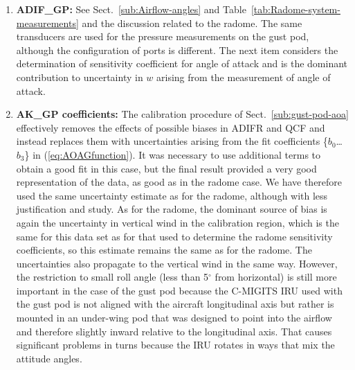 \documentclass[12pt,twoside,english]{article}\usepackage[]{graphicx}\usepackage[]{color}
\begin{document}
{{\begin{enumerate}
\item \textbf{ADIF\_GP: }See Sect.~\ref{sub:Airflow-angles} and Table~\ref{tab:Radome-system-measurements} and the discussion related to the radome. The same transducers are used for the pressure measurements on the gust pod, although the configuration of ports is different. The next item considers the determination of sensitivity coefficient for angle of attack and is the dominant contribution to uncertainty in $w$ arising from the measurement of angle of attack.  
\item \textbf{AK\_GP coefficients:} The calibration procedure of Sect.~\ref{sub:gust-pod-aoa}
effectively removes the effects of possible biases in ADIFR and QCF and instead replaces them with uncertainties arising from the fit coefficients \{$b_0$\dots$b_3$\} in (\ref{eq:AOAGfunction}). It was necessary to use additional terms to obtain a good fit in this case, but the final result provided a very good representation of the data, as good as in the radome case. We have therefore used the same uncertainty estimate as for the radome, although with less justification and study. As for the radome, the dominant source of bias is again the uncertainty in vertical wind in the calibration region, which is the same for this data set as for that used to determine the radome sensitivity coefficients, so this estimate remains the same as for the radome. The uncertainties also propagate to the vertical wind in the same way. However, the restriction to small roll angle (less than 5$^{\circ}$ from horizontal) is still more important in the case of the gust pod because the C-MIGITS IRU used with the gust pod is not aligned with the aircraft longitudinal axis but rather is mounted in an under-wing pod that was designed to point into the airflow and therefore slightly inward relative to the longitudinal axis. That causes significant problems in turns because the IRU rotates in ways that mix the attitude angles. 


\end{enumerate}}}
\end{document}
